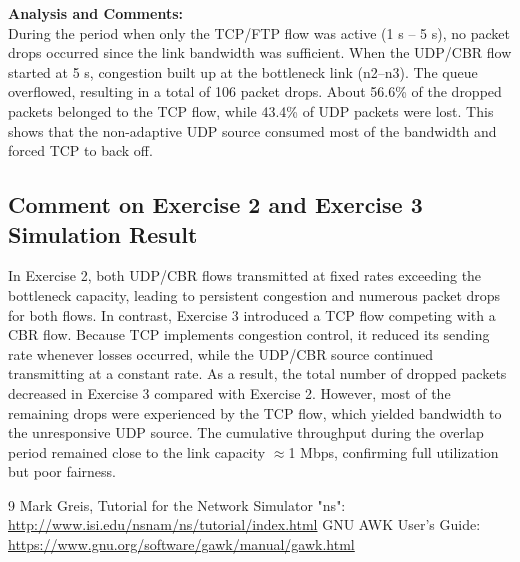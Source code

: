 \documentclass[12pt]{article}
\begin{document}
	\noindent
	\textbf{Analysis and Comments:}	\\
	During the period when only the TCP/FTP flow was active (1 s – 5 s), no packet drops occurred since the link bandwidth was sufficient. When the UDP/CBR flow started at 5 s, congestion built up at the bottleneck link (n2–n3). The queue overflowed, resulting in a total of 106 packet drops. About 56.6\% of the dropped packets belonged to the TCP flow, while 43.4\% of UDP packets were lost. This shows that the non-adaptive UDP source consumed most of the bandwidth and forced TCP to back off.
	
	\subsection{Comment on Exercise 2 and Exercise 3 Simulation Result}
	In Exercise 2, both UDP/CBR flows transmitted at fixed rates exceeding the bottleneck capacity, leading to persistent congestion and numerous packet drops for both flows. In contrast, Exercise 3 introduced a TCP flow competing with a CBR flow. Because TCP implements congestion control, it reduced its sending rate whenever losses occurred, while the UDP/CBR source continued transmitting at a constant rate. As a result, the total number of dropped packets decreased in Exercise 3 compared with Exercise 2. However, most of the remaining drops were experienced by the TCP flow, which yielded bandwidth to the unresponsive UDP source. The cumulative throughput during the overlap period remained close to the link capacity $\approx$1 Mbps, confirming full utilization but poor fairness.
	
	
	\begin{thebibliography}{9}
		 Mark Greis, Tutorial for the Network Simulator "ns": \url{http://www.isi.edu/nsnam/ns/tutorial/index.html}
		 GNU AWK User's Guide: 
		\url{https://www.gnu.org/software/gawk/manual/gawk.html}
	\end{thebibliography}
\end{document}
